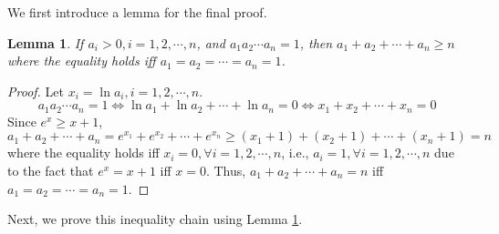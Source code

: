 \documentclass{article}
\newtheorem{lemma}[thm]{Lemma}
\theoremstyle{remark}
\begin{document}
We first introduce a lemma for the final proof.
\begin{lemma}\label{lemma-4-average-inequalities}
If $a_i>0, i=1,2,\cdots,n$, and $a_1a_2\cdots a_n=1$, then $a_1+a_2+\cdots+a_n\ge n$ where the equality holds iff $a_1=a_2=\cdots=a_n=1$.
\end{lemma}
\begin{proof}
Let $x_i=\ln a_i, i=1,2,\cdots,n$.
\[
a_1a_2\cdots a_n=1\Longleftrightarrow \ln a_1+\ln a_2+\cdots+\ln a_n=0\Longleftrightarrow x_1+x_2+\cdots+x_n=0
\]
Since $e^x\ge x+1$,
\[
a_1+a_2+\cdots +a_n=e^{x_1}+e^{x_2}+\cdots+e^{x_n}\ge (x_1+1)+(x_2+1)+\cdots+(x_n+1)= n
\]
where the equality holds iff $x_i=0, \forall i=1,2,\cdots,n$, i.e., $a_i=1, \forall i=1,2,\cdots,n$ due to the fact that $e^x=x+1$ iff $x=0$. Thus, $a_1+a_2+\cdots +a_n=n$ iff $a_1=a_2=\cdots=a_n=1$.
\end{proof}
Next, we prove this inequality chain using Lemma \ref{lemma-4-average-inequalities}.
\end{document}
